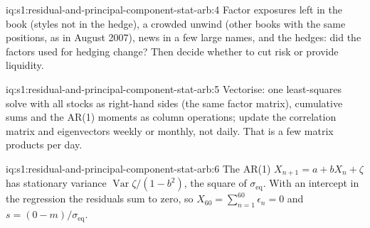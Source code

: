 \begin{solution}{iq:s1:residual-and-principal-component-stat-arb:4}
Factor exposures left in the book (styles not in the hedge), a crowded unwind (other books with the same positions, as in August 2007), news in a few large
names, and the hedges: did the factors used for hedging change? Then decide whether to cut risk or provide liquidity.
\end{solution}

\begin{solution}{iq:s1:residual-and-principal-component-stat-arb:5}
Vectorise: one least-squares solve with all stocks as right-hand sides (the same factor matrix), cumulative sums and the AR(1) moments as column operations;
update the correlation matrix and eigenvectors weekly or monthly, not daily. That is a few matrix products per day.
\end{solution}

\begin{solution}{iq:s1:residual-and-principal-component-stat-arb:6}
The AR(1) $X_{n+1} = a + bX_n + \zeta$ has stationary variance $\operatorname{Var}\zeta/(1 - b^2)$, the square of $\sigma_{\mathrm{eq}}$. With an intercept in
the regression the residuals sum to zero, so $X_{60} = \sum_{n=1}^{60} \epsilon_n = 0$ and $s = (0 - m)/\sigma_{\mathrm{eq}}$.
\end{solution}
